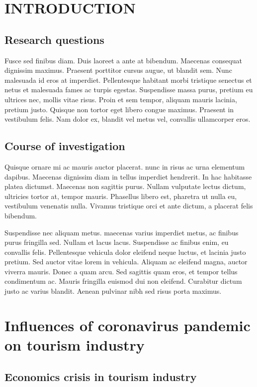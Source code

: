 \documentclass[draft=false
              ,paper=a4
              ,twoside=false
              ,fontsize=10pt
              ,headsepline
              ,BCOR10mm
              ,DIV11
              ]{article}
\begin{document}
\section{INTRODUCTION}
\subsection{Research questions}

Fusce sed finibus diam. Duis laoreet a ante at bibendum. Maecenas consequat dignissim maximus. Praesent porttitor cursus augue, ut blandit sem. Nunc malesuada id eros at imperdiet. Pellentesque habitant morbi tristique senectus et netus et malesuada fames ac turpis egestas. Suspendisse massa purus, pretium eu ultrices nec, mollis vitae risus. Proin et sem tempor, aliquam mauris lacinia, pretium justo. Quisque non tortor eget libero congue maximus. Praesent in vestibulum felis. Nam dolor ex, blandit vel metus vel, convallis ullamcorper eros.


\subsection{Course of investigation}

Quisque ornare mi ac mauris auctor placerat. nunc in risus ac urna elementum dapibus. Maecenas dignissim diam in tellus imperdiet hendrerit. In hac habitasse platea dictumst. Maecenas non sagittis purus. Nullam vulputate lectus dictum, ultricies tortor at, tempor mauris. Phasellus libero est, pharetra ut nulla eu, vestibulum venenatis nulla. Vivamus tristique orci et ante dictum, a placerat felis bibendum.

Suspendisse nec aliquam metus. maecenas varius imperdiet metus, ac finibus purus fringilla sed. Nullam et lacus lacus. Suspendisse ac finibus enim, eu convallis felis. Pellentesque vehicula dolor eleifend neque luctus, et lacinia justo pretium. Sed auctor vitae lorem in vehicula. Aliquam ac eleifend magna, auctor viverra mauris. Donec a quam arcu. Sed sagittis quam eros, et tempor tellus condimentum ac. Mauris fringilla euismod dui non eleifend. Curabitur dictum justo ac varius blandit. Aenean pulvinar nibh sed risus porta maximus.

\section{Influences of coronavirus pandemic on tourism industry}
\subsection{Economics crisis in tourism industry}
\end{document}
